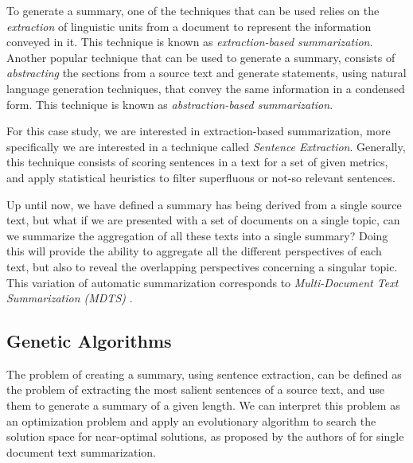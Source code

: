 \documentclass[12pt, titlepage]{uo_temp}
\begin{document}
     To generate a summary, one of the techniques that can be used relies on the
     \emph{extraction} of linguistic units from a document to represent the information
     conveyed in it. This technique is known as \emph{extraction-based
       summarization}. Another popular technique that can be used to generate a summary,
     consists of \emph{abstracting} the sections from a source text and generate
     statements, using natural language generation techniques, that convey the same
     information in a condensed form. This technique is known as \emph{abstraction-based
       summarization}.

     For this case study, we are interested in extraction-based summarization, more
     specifically we are interested in a technique called \emph{Sentence
       Extraction}. Generally, this technique consists of scoring sentences in a text for
     a set of given metrics, and apply statistical heuristics to filter superfluous or
     not-so relevant sentences.

     Up until now, we have defined a summary has being derived from a single source text,
     but what if we are presented with a set of documents on a single topic, can we
     summarize the aggregation of all these texts into a single summary? Doing this will
     provide the ability to aggregate all the different perspectives of each text, but
     also to reveal the overlapping perspectives concerning a singular topic. This
     variation of automatic summarization corresponds to \emph{Multi-Document Text
       Summarization (MDTS)} \cite{goldstein2000multi}.


     \subsection{Genetic Algorithms}
     The problem of creating a summary, using sentence extraction, can be defined as the
     problem of extracting the most salient sentences of a source text, and use them to
     generate a summary of a given length. We can interpret this problem as an
     optimization problem and apply an evolutionary algorithm to search the solution space
     for near-optimal solutions, as proposed by the authors of
     \cite{qazvinian2008summarising} for single document text summarization.
\end{document}
